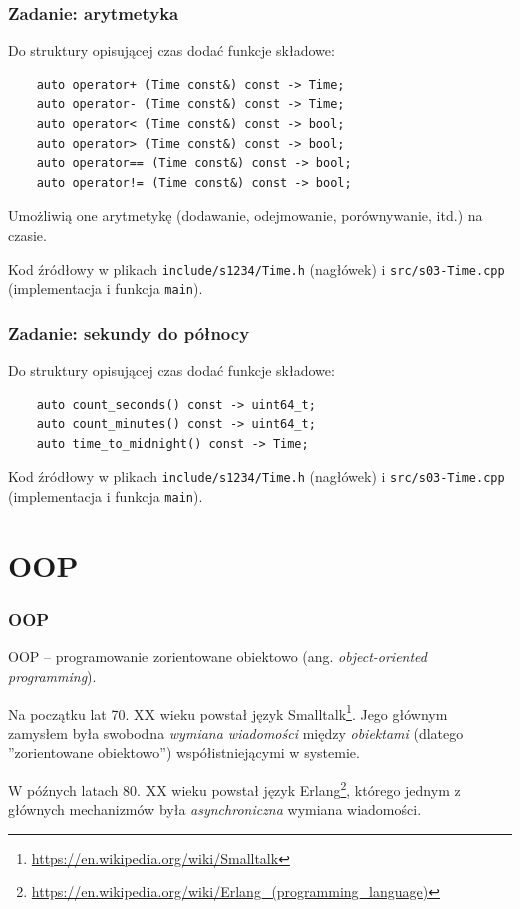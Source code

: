 \documentclass[aspectratio=169]{beamer}
\begin{document}
\begin{frame}[fragile]
    \frametitle{Zadanie: arytmetyka}
    \label{lecture_exercise_3}

    Do struktury opisującej czas dodać funkcje składowe:

    {\scriptsize
    \begin{lstlisting}
    auto operator+ (Time const&) const -> Time;
    auto operator- (Time const&) const -> Time;
    auto operator< (Time const&) const -> bool;
    auto operator> (Time const&) const -> bool;
    auto operator== (Time const&) const -> bool;
    auto operator!= (Time const&) const -> bool;
    \end{lstlisting}}

    Umożliwią one arytmetykę (dodawanie, odejmowanie, porównywanie, itd.) na czasie.

    \vspace{1em}

    Kod źródłowy w plikach {\tt include/s1234/Time.h} (nagłówek) i
    {\tt src/s03-Time.cpp} (implementacja i funkcja {\tt main}).
\end{frame}

\begin{frame}[fragile]
    \frametitle{Zadanie: sekundy do północy}
    \label{lecture_exercise_3}

    Do struktury opisującej czas dodać funkcje składowe:

    {\scriptsize
    \begin{lstlisting}
    auto count_seconds() const -> uint64_t;
    auto count_minutes() const -> uint64_t;
    auto time_to_midnight() const -> Time;
    \end{lstlisting}}

    \vspace{1em}

    Kod źródłowy w plikach {\tt include/s1234/Time.h} (nagłówek) i
    {\tt src/s03-Time.cpp} (implementacja i funkcja {\tt main}).
\end{frame}


\section{OOP}

\begin{frame}
    \frametitle{OOP}

    OOP -- programowanie zorientowane obiektowo (ang. \emph{object-oriented
    programming}).

    \vspace{1em}

    Na początku lat 70. XX wieku powstał język
    Smalltalk\footnote{\url{https://en.wikipedia.org/wiki/Smalltalk}}. Jego
    głównym zamysłem była swobodna \emph{wymiana wiadomości} między
    \emph{obiektami} (dlatego ''zorientowane obiektowo'') współistniejącymi w
    systemie.

    W późnych latach 80. XX wieku powstał język
    Erlang\footnote{\url{https://en.wikipedia.org/wiki/Erlang_(programming_language)}},
    którego jednym z głównych mechanizmów była \emph{asynchroniczna} wymiana
    wiadomości.
\end{frame}
\end{document}
